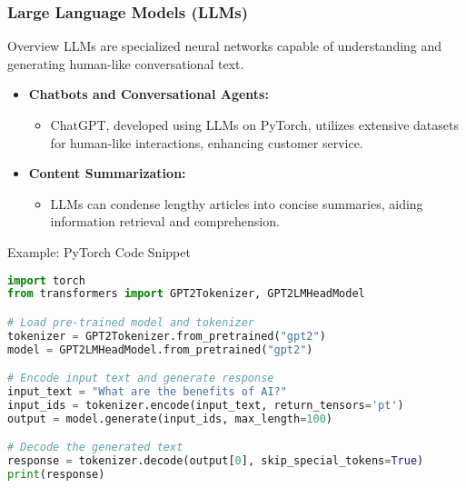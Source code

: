 \documentclass[aspectratio=169]{beamer}
\begin{document}
\begin{frame}[fragile]
    \frametitle{Large Language Models (LLMs)}
    \begin{block}{Overview}
        LLMs are specialized neural networks capable of understanding and generating human-like conversational text.
    \end{block}
    
    \begin{itemize}
        \item \textbf{Chatbots and Conversational Agents:}
        \begin{itemize}
            \item ChatGPT, developed using LLMs on PyTorch, utilizes extensive datasets for human-like interactions, enhancing customer service.
        \end{itemize}

        \item \textbf{Content Summarization:}
        \begin{itemize}
            \item LLMs can condense lengthy articles into concise summaries, aiding information retrieval and comprehension.
        \end{itemize}
    \end{itemize}

    \begin{block}{Example: PyTorch Code Snippet}
        \begin{lstlisting}[language=Python]
import torch
from transformers import GPT2Tokenizer, GPT2LMHeadModel

# Load pre-trained model and tokenizer
tokenizer = GPT2Tokenizer.from_pretrained("gpt2")
model = GPT2LMHeadModel.from_pretrained("gpt2")

# Encode input text and generate response
input_text = "What are the benefits of AI?"
input_ids = tokenizer.encode(input_text, return_tensors='pt')
output = model.generate(input_ids, max_length=100)

# Decode the generated text
response = tokenizer.decode(output[0], skip_special_tokens=True)
print(response)
        \end{lstlisting}
    \end{block}
\end{frame}
\end{document}
